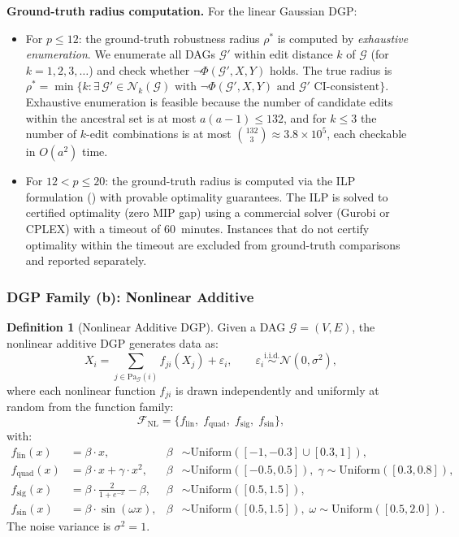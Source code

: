 \documentclass[11pt,a4paper]{article}
\theoremstyle{definition}
\newtheorem{definition}[theorem]{Definition}
\theoremstyle{remark}
\newcommand{\DAG}{\mathcal{G}}
\newcommand{\Pa}{\mathrm{Pa}}
\newcommand{\radius}{\rho}
\newcommand{\Nk}{\mathcal{N}_k}
\newcommand{\Phi}{\varPhi}
\begin{document}
\noindent\textbf{Ground-truth radius computation.} For the linear
Gaussian DGP:
\begin{itemize}
  \item For $p \leq 12$: the ground-truth robustness radius $\radius^*$
    is computed by \emph{exhaustive enumeration}. We enumerate all DAGs
    $\DAG'$ within edit distance $k$ of $\DAG$ (for $k = 1, 2, 3, \ldots$)
    and check whether $\neg\Phi(\DAG', X, Y)$ holds. The true radius is
    $\radius^* = \min\{k : \exists\, \DAG' \in \Nk(\DAG) \text{ with }
    \neg\Phi(\DAG', X, Y) \text{ and } \DAG' \text{ CI-consistent}\}$.
    Exhaustive enumeration is feasible because the number of candidate
    edits within the ancestral set is at most $a(a-1) \leq 132$, and
    for $k \leq 3$ the number of $k$-edit combinations is at most
    $\binom{132}{3} \approx 3.8 \times 10^5$, each checkable in
    $O(a^2)$ time.
  \item For $12 < p \leq 20$: the ground-truth radius is computed via
    the ILP formulation () with provable optimality
    guarantees. The ILP is solved to certified optimality (zero MIP gap)
    using a commercial solver (Gurobi or CPLEX) with a timeout of
    60~minutes. Instances that do not certify optimality within the
    timeout are excluded from ground-truth comparisons and reported
    separately.
\end{itemize}

\subsubsection{DGP Family (b): Nonlinear Additive}

\begin{definition}[Nonlinear Additive DGP]\label{def:dgp_nonlinear}
Given a DAG $\DAG = (V, E)$, the nonlinear additive DGP generates data
as:
\[
  X_i = \sum_{j \in \Pa_\DAG(i)} f_{ji}(X_j) + \varepsilon_i,
  \qquad \varepsilon_i \stackrel{\text{i.i.d.}}{\sim} \mathcal{N}(0, \sigma^2),
\]
where each nonlinear function $f_{ji}$ is drawn independently and
uniformly at random from the function family:
\[
  \mathcal{F}_{\mathrm{NL}} = \{f_{\mathrm{lin}},\;
    f_{\mathrm{quad}},\; f_{\mathrm{sig}},\; f_{\mathrm{sin}}\},
\]
with:
\begin{align*}
  f_{\mathrm{lin}}(x) &= \beta \cdot x, &
    \beta &\sim \mathrm{Uniform}([-1,-0.3] \cup [0.3,1]), \\
  f_{\mathrm{quad}}(x) &= \beta \cdot x + \gamma \cdot x^2, &
    \beta &\sim \mathrm{Uniform}([-0.5, 0.5]),\;
    \gamma \sim \mathrm{Uniform}([0.3, 0.8]), \\
  f_{\mathrm{sig}}(x) &= \beta \cdot \frac{2}{1 + e^{-x}} - \beta, &
    \beta &\sim \mathrm{Uniform}([0.5, 1.5]), \\
  f_{\mathrm{sin}}(x) &= \beta \cdot \sin(\omega x), &
    \beta &\sim \mathrm{Uniform}([0.5, 1.5]),\;
    \omega \sim \mathrm{Uniform}([0.5, 2.0]).
\end{align*}
The noise variance is $\sigma^2 = 1$.
\end{definition}
\end{document}
